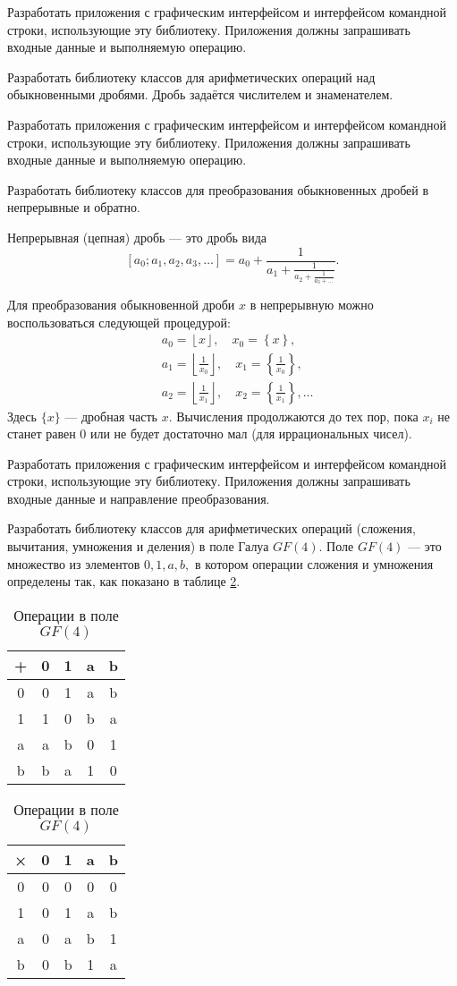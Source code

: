 Разработать приложения с графическим интерфейсом и интерфейсом
командной строки, использующие эту библиотеку. Приложения должны
запрашивать входные данные и выполняемую операцию.

\task Разработать библиотеку классов для арифметических операций над
обыкновенными дробями. Дробь задаётся числителем и знаменателем.

Разработать приложения с графическим интерфейсом и интерфейсом
командной строки, использующие эту библиотеку. Приложения должны
запрашивать входные данные и выполняемую операцию.

\task Разработать библиотеку классов для преобразования обыкновенных
дробей в непрерывные и обратно.

Непрерывная (цепная) дробь — это дробь вида
\[
[a_0; a_1, a_2, a_3, \dots] = a_0 + \frac1{a_1 + \frac1{a_2 + \frac1{a_3 + \dots}}}.
\]

Для преобразования обыкновенной дроби $x$ в непрерывную можно
воспользоваться следующей процедурой:
\begin{align*}
&a_0 = \left\lfloor x \right\rfloor,\quad x_0 = \left\{x\right\},\\
&a_1 = \left\lfloor \frac1{x_0} \right\rfloor,\quad x_1 = \left\{\frac1{x_0}\right\},\\
&a_2 = \left\lfloor \frac1{x_1} \right\rfloor,\quad x_2 = \left\{\frac1{x_1}\right\}, \dots
\end{align*}
Здесь $\{x\}$ — дробная часть $x$. Вычисления продолжаются до тех пор,
пока $x_i$ не станет равен $0$ или не будет достаточно мал (для
иррациональных чисел).

Разработать приложения с графическим интерфейсом и интерфейсом
командной строки, использующие эту библиотеку. Приложения должны
запрашивать входные данные и направление преобразования.

\task Разработать библиотеку классов для арифметических операций
(сложения, вычитания, умножения и деления) в поле Галуа $GF(4)$. Поле
$GF(4)$ — это множество из элементов ${0, 1, a, b},$ в котором
операции сложения и умножения определены так, как показано в таблице
\ref{table:GF4}.

\begin{table}
  \parbox{.45\linewidth}{
    \centering
    \begin{tabular}{c|cccc}
      +&0&1&a&b\\
      \hline
      0&0&1&a&b\\
      1&1&0&b&a\\
      a&a&b&0&1\\
      b&b&a&1&0
    \end{tabular}
  }
  \hfill
  \parbox{.45\linewidth}{
    \centering
    \begin{tabular}{c|cccc}
      ×&0&1&a&b\\
      \hline
      0&0&0&0&0\\
      1&0&1&a&b\\
      a&0&a&b&1\\
      b&0&b&1&a
    \end{tabular}
  }
\caption{Операции в поле $GF(4)$}\label{table:GF4}
\end{table}


